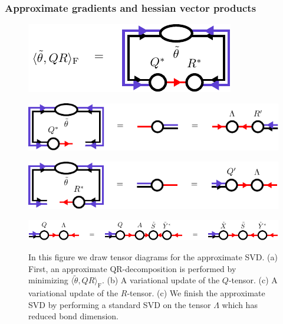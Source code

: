\subsubsection*{\hspace{70pt}Approximate gradients and hessian vector products}
\begin{figure}
	\centering
	\subcaptionbox{\label{fig:approximate_svd_overlap}}
	{%
		\includegraphics[scale=1]{figures/tikz/disoTPS/approximate_svd/approximate_svd_a.pdf}
	}
	\par\bigskip
	\subcaptionbox{\label{fig:approximate_svd_first_step}}
	{%
		\includegraphics[scale=1]{figures/tikz/disoTPS/approximate_svd/approximate_svd_b.pdf}
	}
	\par\bigskip
	\subcaptionbox{\label{fig:approximate_svd_second_step}}
	{%
		\includegraphics[scale=1]{figures/tikz/disoTPS/approximate_svd/approximate_svd_c.pdf}
	}
	\par\bigskip
	\subcaptionbox{\label{fig:approximate_svd_final_step}}
	{%
		\includegraphics[scale=1]{figures/tikz/disoTPS/approximate_svd/approximate_svd_d.pdf}
	}
	\caption{In this figure we draw tensor diagrams for the approximate SVD. (a) First, an approximate QR-decomposition is performed by minimizing $\langle\tilde{\theta},QR\rangle_\text{F}$. (b) A variational update of the $Q$-tensor. (c) A variational update of the $R$-tensor. (c) We finish the approximate SVD by performing a standard SVD on the tensor $\Lambda$ which has reduced bond dimension.}
	\label{fig:approximate_qr_decomposition}
\end{figure}
